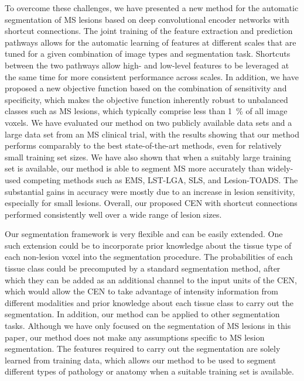 To overcome these challenges, we have presented a new method for the automatic
segmentation of MS lesions based on deep convolutional encoder networks with
shortcut connections. The joint training of the feature extraction and
prediction pathways allows for the automatic learning of features at different
scales that are tuned for a given combination of image types and segmentation
task. Shortcuts between the two pathways allow high- and low-level features to
be leveraged at the same time for more consistent performance across scales. In
addition, we have proposed a new objective function based on the combination of
sensitivity and specificity, which makes the objective function inherently
robust to unbalanced classes such as MS lesions, which typically comprise less
than \SI{1}{\percent} of all image voxels. We have evaluated our method on two
publicly available data sets and a large data set from an MS clinical trial,
with the results showing that our method performs comparably to the best
state-of-the-art methods, even for relatively small training set sizes. We have
also shown that when a suitably large training set is available, our method is
able to segment MS more accurately than widely-used competing methods such as
EMS, LST-LGA, SLS, and Lesion-TOADS. The substantial gains in accuracy were
mostly due to an increase in lesion sensitivity, especially for small lesions.
Overall, our proposed CEN with shortcut connections performed consistently well
over a wide range of lesion sizes.

Our segmentation framework is very flexible and can be easily extended. One such
extension could be to incorporate prior knowledge about the tissue type of each
non-lesion voxel into the segmentation procedure. The probabilities of each
tissue class could be precomputed by a standard segmentation method, after which
they can be added as an additional channel to the input units of the CEN, which
would allow the CEN to take advantage of intensity information from different
modalities and prior knowledge about each tissue class to carry out the
segmentation. In addition, our method can be applied to other segmentation
tasks. Although we have only focused on the segmentation of MS lesions in this
paper, our method does not make any assumptions specific to MS lesion
segmentation. The features required to carry out the segmentation are solely
learned from training data, which allows our method to be used to segment
different types of pathology or anatomy when a suitable training set is
available.
